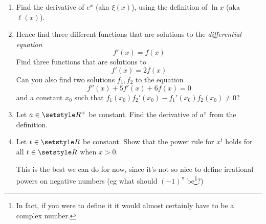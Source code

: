 \begin{enumerate}
  This means that \(\xi(n \cdot \ell(x))\) coincides with \(x^n\) for all
  rational \(n\) when \(x\) is positive. Since \(\xi\) and \(\ell\) are both
  quite nice, ``smooth'' functions, it is nice to \emph{define}
  \begin{equation*}
   x^t \defeq \xi(t \cdot \ell(x))
  \end{equation*}
  for \(t \in \Reals\) and \(x\) positive. This agrees with the old definitions,
  and ensures various nice continuity properties.

  If we \emph{define}\footnote{
   One should stress again that this is not the only definition of \(e\)
   (although any correct alternative definition should imply that this one is
   also true)
  } \(e \defeq \xi(1)\), then
  \(e^x \equiv \xi(x \cdot \ell(\xi(1))) \equiv \xi(x)\). So in fact \(\xi\) has
  been the famous ``exponential function'' all this time! This is one of the
  reasons that the number \(e\) is significant. From now on I will write \(e^x\)
  or \(\exp x\) instead of \(\xi(x)\), and \(\ln x\) or
  \(\log x\)\footnote{
   standing for ``natural logarithm'' (logarithmus naturalis) and ``logarithm'',
   respectively.
  }
  instead of \(\ell(x)\).
 \item
  Find the derivative of \(e^x\) (aka \(\xi(x)\)), using the definition of
  \(\ln x\) (aka \(\ell(x)\)).
 \item
  Hence find three different functions that are solutions to the
  \emph{differential equation}
  \begin{equation*}
   f'(x) = f(x)
  \end{equation*}
  Find three functions that are solutions to
  \begin{equation*}
   f'(x) = 2f(x)
  \end{equation*}
  Can you also find two solutions \(f_1, f_2\) to the equation
  \begin{equation*}
   f''(x) + 5f'(x) + 6f(x) = 0
  \end{equation*}
  and a constant \(x_0\) such that
  \(f_1(x_0) f_2'(x_0) - f_1'(x_0) f_2(x_0) \ne 0\)?
 \item
  Let \(a \in \Reals^+\) be constant. Find the derivative of \(a^x\) from the
  definition.
 \item
  Let \(t \in \Reals\) be constant. Show that the power rule for \(x^t\) holds
  for all \(t \in \Reals\) when \(x > 0\).

  This is the best we can do for now, since it's not so nice to define
  irrational powers on negative numbers (eg what should \((-1)^\pi\)
  be\footnote{
   In fact, if you were to define it it would almost certainly have to be a
   complex number.
  }?)


\end{enumerate}
